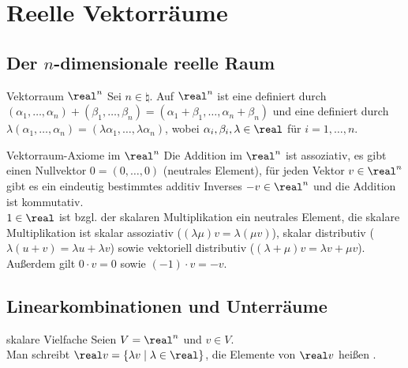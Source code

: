 \section{%
    Reelle Vektorräume%
}

\subsection{%
    \texorpdfstring{Der $n$-dimensionale reelle Raum}%
    {Der n-dimensionale reelle Raum}%
}

\begin{Def}{Vektorraum $\real^n$}
    Sei $n \in \natural$.
    Auf $\real^n$ ist eine  definiert durch \\
    $(\alpha_1, \ldots, \alpha_n) + (\beta_1, \ldots, \beta_n)
    = (\alpha_1 + \beta_1, \ldots, \alpha_n + \beta_n)$ und eine
     definiert durch
    $\lambda (\alpha_1, \ldots, \alpha_n) =
    (\lambda \alpha_1, \ldots, \lambda \alpha_n)$,
    wobei $\alpha_i, \beta_i, \lambda \in \real$ für $i = 1, \ldots, n$.
\end{Def}

\begin{Satz}{Vektorraum-Axiome im $\real^n$}
    Die Addition im $\real^n$ ist assoziativ, es gibt einen Nullvektor
    $0 = (0, \ldots, 0)$ (neutrales Element), für jeden Vektor $v \in \real^n$
    gibt es ein eindeutig bestimmtes additiv Inverses $-v \in \real^n$
    und die Addition ist kommutativ. \\
    $1 \in \real$ ist bzgl. der skalaren Multiplikation ein neutrales Element,
    die skalare Multiplikation ist skalar assoziativ
    ($(\lambda \mu) v = \lambda (\mu v)$),
    skalar distributiv ($\lambda (u + v) = \lambda u + \lambda v$) sowie
    vektoriell distributiv ($(\lambda + \mu) v = \lambda v + \mu v$). \qquad
    Außerdem gilt $0 \cdot v = 0$ sowie $(-1) \cdot v = -v$.
\end{Satz}

\subsection{%
    Linearkombinationen und Unterräume%
}

\begin{Def}{skalare Vielfache}
    Seien $V = \real^n$ und $v \in V$. \\
    Man schreibt $\real v = \{\lambda v \;|\; \lambda \in \real\}$,
    die Elemente von $\real v$ heißen .
\end{Def}

